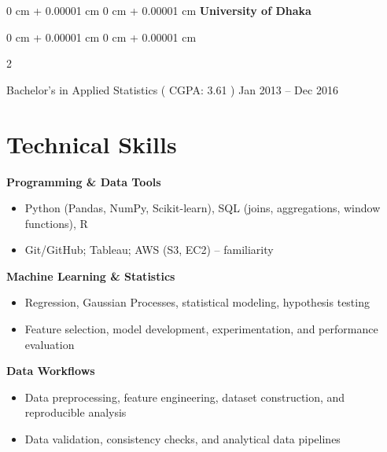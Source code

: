 \documentclass[10pt, letterpaper]{article}
\newenvironment{highlights}{
    \begin{itemize}[
        topsep=0.10 cm,
        parsep=0.10 cm,
        partopsep=0pt,
        itemsep=0pt,
        leftmargin=0 cm + 10pt
    ]
}{
    \end{itemize}
} %
\newenvironment{onecolentry}{
    \begin{adjustwidth}{
        0 cm + 0.00001 cm
    }{
        0 cm + 0.00001 cm
    }
}{
    \end{adjustwidth}
} %
\newenvironment{twocolentry}[2][]{
    \onecolentry
    \def\secondColumn{#2}
    \setcolumnwidth{\fill, 4.5 cm}
    \begin{paracol}{2}
}{
    \switchcolumn \raggedleft \secondColumn
    \end{paracol}
    \endonecolentry
} %
\begin{document}
            \vspace{0.20 cm}
     \begin{onecolentry}{
    \textbf{University of Dhaka}
    }
    \end{onecolentry}        
    \begin{twocolentry}{
            Jan 2013 – Dec 2016
        }
            Bachelor's in Applied Statistics ( CGPA: 3.61 )\end{twocolentry}
        \vspace{0.10 cm}


\section*{Technical Skills}

\textbf{Programming \& Data Tools}
\begin{itemize}
    \item Python (Pandas, NumPy, Scikit-learn), SQL (joins, aggregations, window functions), R
    \item Git/GitHub; Tableau; AWS (S3, EC2) -- familiarity
\end{itemize}

\textbf{Machine Learning \& Statistics}
\begin{itemize}
    \item Regression, Gaussian Processes, statistical modeling, hypothesis testing
    \item Feature selection, model development, experimentation, and performance evaluation
\end{itemize}

\textbf{Data Workflows}
\begin{itemize}
    \item Data preprocessing, feature engineering, dataset construction, and reproducible analysis
    \item Data validation, consistency checks, and analytical data pipelines
\end{itemize}
   
\end{document}
